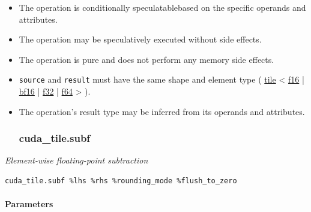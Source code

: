 \documentclass{article}
\begin{document}
\begin{itemize}
\item The operation is conditionally speculatablebased on the specific operands and attributes.
\item The operation may be speculatively executed without side effects.
\item The operation is pure and does not perform any memory side effects.
\item \texttt{source} and \texttt{result} must have the same shape and element type ( \href{https://docs.nvidia.com/cuda/tile-ir/latest/sections/types.html#type-tile}{tile} < \href{https://docs.nvidia.com/cuda/tile-ir/latest/sections/types.html#subsection-element-types}{f16} | \href{https://docs.nvidia.com/cuda/tile-ir/latest/sections/types.html#subsection-element-types}{bf16} | \href{https://docs.nvidia.com/cuda/tile-ir/latest/sections/types.html#subsection-element-types}{f32} | \href{https://docs.nvidia.com/cuda/tile-ir/latest/sections/types.html#subsection-element-types}{f64} > ).
\item The operation's result type may be inferred from its operands and attributes.


\subsubsection{cuda\_tile.subf}

\end{itemize}
\textit{Element-wise floating-point subtraction}


\begin{lstlisting}
cuda_tile.subf %lhs %rhs %rounding_mode %flush_to_zero
\end{lstlisting}

\paragraph{Parameters}
\end{document}
